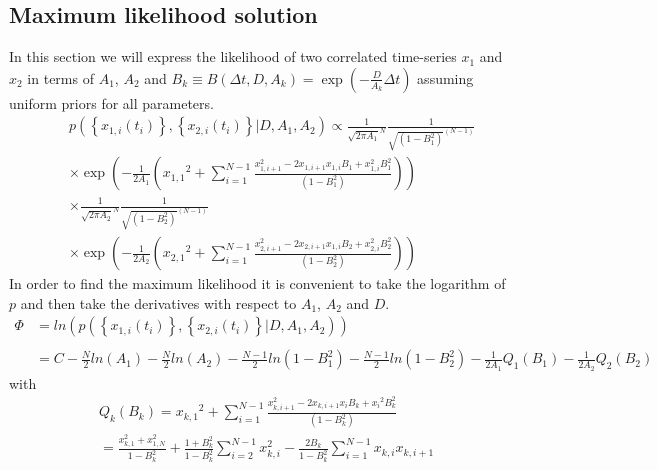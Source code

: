 \documentclass[%
 reprint,
 amsmath,amssymb,
 aps,
]{revtex4-1}
\begin{document}
\subsection{Maximum likelihood solution}
In this section we will express the likelihood of two correlated time-series $x_1$ and $x_2$ in terms of $A_{1}$, $A_{2}$ and $B_{k}\equiv B(\Delta t,D,A_{k})=\exp\left(-\frac{D}{A_{k}}\Delta t\right)$ assuming uniform priors for all parameters.
\begin{eqnarray}
	&&p\left( \left\{x_{1,i}(t_i)\right\},\left\{x_{2,i}(t_i)\right\} \left| D, A_{1},A_{2} \right.\right) \propto
	\frac{1}{\sqrt {2 \pi A_{1}}^{N} }
	\frac{1}{{\sqrt {(1-B_{1}^{2})}^{(N-1)} }}\\
	&&\times\exp \left( -\frac{1}{2A_{1}}\left( {x_{1,1}}^{2} + 
	\sum\limits_{i=1}^{N-1}\frac{ x_{1,i+1}^{2} - 2x_{1,i+1}x_{1,i}B_{1} +x_{1,i}^{2}B_{1}^{2} }{(1-B_{1}^{2})} \right)\right)\nonumber\\
	&&\times\frac{1}{\sqrt {2 \pi A_{2}}^{N} }
	\frac{1}{{\sqrt {(1-B_{2}^{2})}^{(N-1)} }}\\
	&&\times\exp \left( -\frac{1}{2A_{2}}\left( {x_{2,1}}^{2} + 
	\sum\limits_{i=1}^{N-1}\frac{ x_{2,i+1}^{2} - 2x_{2,i+1}x_{1,i}B_{2} +x_{2,i}^{2}B_{2}^{2} }{(1-B_{2}^{2})} \right)\right)\nonumber
\end{eqnarray}
In order to find the maximum likelihood it is convenient to take the logarithm of $p$ and then take the derivatives with respect to $A_{1}$, $A_{2}$ and $D$.
\begin{equation}
\begin{aligned}
	\Phi &= ln \left( p\left( \left\{x_{1,i}(t_i)\right\},\left\{x_{2,i}(t_i)\right\} \left|  D, A_{1},A_{2} \right.\right) \right)\\\\
	&= C - \frac{N}{2} ln(A_{1}) - \frac{N}{2} ln(A_{2})- \frac{N-1}{2}ln \left( 1-B_{1}^{2}\right) - \frac{N-1}{2}ln \left( 1-B_{2}^{2}\right) -\frac{1}{2A_{1}}Q_{1}(B_{1})-\frac{1}{2A_{2}}Q_{2}(B_{2})
\end{aligned}
\end{equation}
with\begin{equation}
	\begin{aligned}
	&Q_{k}(B_{k}) = {x_{k,1}}^{2} + \sum\limits_{i=1}^{N-1}\frac{ {x_{k,i+1}^{2} - 2x_{k,i+1}{x_i}B_{k}} +{x_i}^{2}B_{k}^{2} }{(1-B_{k}^{2})}\\
	&= \frac{x_{k,1}^{2}+x_{1,N}^{2}}{1-B_{k}^2}+\frac{1+B_{k}^2}{1-B_{k}^2}\sum\limits_{i=2}^{N-1}x_{k,i}^{2}-\frac{2B_{k}}{1-B_{k}^2}\sum\limits_{i=1}^{N-1}x_{k,i}x_{k,i+1}
	\end{aligned}
\end{equation}
\end{document}
